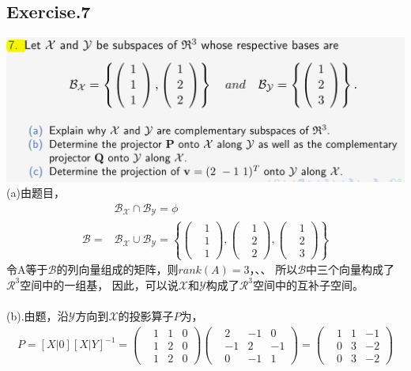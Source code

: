 \documentclass[UTF8,12pt, a4paper]{ctexart}
\begin{document}
\subsection*{Exercise.7}
\includegraphics[scale=0.8]{question7.png}\\
(a)由题目，
\begin{align*}
  &\mathcal{B}_{\mathcal{X}} \cap \mathcal{B}_{\mathcal{Y}}=\phi \\
  \mathcal{B}=&\mathcal{B}_{\mathcal{X}} \cup \mathcal{B}_{\mathcal{Y}} = 
  \left\{
    \left(
      \begin{matrix}
        &1 \\
        &1 \\
        &1
      \end{matrix}
    \right),
    \left(
      \begin{matrix}
        &1 \\
        &2 \\
        &2
      \end{matrix}
    \right),
    \left(
      \begin{matrix}
        &1 \\
        &2 \\
        &3
      \end{matrix}
    \right)
  \right\}
\end{align*}
令A等于$\mathcal{B}$的列向量组成的矩阵，则$rank(A)=3$，、、
所以$\mathcal{B}$中三个向量构成了$\mathcal{R}^3$空间中的一组基，
因此，可以说$\mathcal{X}$和$\mathcal{Y}$构成了$\mathcal{R}^3$空间中的互补子空间。\\ \\
(b).由题，沿$\mathcal{Y}$方向到$\mathcal{X}$的投影算子$P$为，
\begin{align*}
  P=[X|0][X|Y]^{-1}=
  \left(
    \begin{matrix}
      &1 & 1 & 0 \\
      &1 & 2 & 0 \\
      &1 & 2 & 0
    \end{matrix}
  \right)
  \left(
    \begin{matrix}
      &2 & -1 & 0 \\
      &-1 & 2 & -1 \\
      &0 & -1 & 1
    \end{matrix}
  \right) = 
  \left(
    \begin{matrix}
      &1 & 1 & -1 \\
      &0 & 3 & -2 \\
      &0 & 3 & -2
    \end{matrix}
  \right) 
\end{align*}
\end{document}
